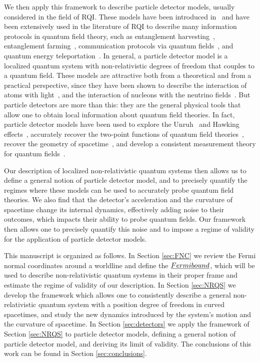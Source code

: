 \documentclass[prd,twocolumn,superscriptaddress,floatfix,amsmath,amssymb,amsfonts,longbibliography,nofootinbib]{revtex4-1}
\begin{document}
We then apply this framework to describe particle detector models, usually considered in the field of RQI. These models have been introduced in~\cite{Unruh1976,DeWitt} and have been extensively used in the literature of RQI to describe many information protocols in quantum field theory, such as entanglement harvesting~\cite{Valentini1991,Reznik1,vacuumEntanglement,vacuumBell,Petar,Pozas-Kerstjens:2015,Pozas2016,ericksonBH,ericksonNew,carol}, entanglement farming~\cite{Farming}, communication protocols via quantum fields~\cite{Benincasa_2014,Jonsson2,Jonsson3,Landulfo,martin-martinez2015,Jonsson4,Katja,Simidzija_2020}, and quantum energy teleportation~\cite{teleportation,nichoTeleport}. In general, a particle detector model is a localized quantum system with non-relativistic degrees of freedom that couples to a quantum field. These models are attractive both from a theoretical and from a practical perspective, since they have been shown to describe the interaction of atoms with light~\cite{Pozas2016,Nicho1,richard}, and the interaction of nucleons with the neutrino fields~\cite{neutrinos,antiparticles,carol}. But particle detectors are more than this: they are the general physical tools that allow one to obtain local information about quantum field theories. In fact, particle detector models have been used to explore the Unruh~\cite{Unruh1976,Takagi,matsasUnruh,waitUnruh,unruhEffectNoThermal,unruhSlow,garay,mine} and Hawking effects~\cite{Unruh1976,bhDetectors,bhDetectorsAdS,bhDetectorsBTZ}, accurately recover the two-point functions of quantum field theories~\cite{pipo,geometry}, recover the geometry of spacetime~\cite{geometry,ahmed}, and develop a consistent measurement theory for quantum fields~\cite{chicken}. 

Our description of localized non-relativistic quantum systems then allows us to define a general notion of particle detector model, and to precisely quantify the regimes where these models can be used to accurately probe quantum field theories. We also find that the detector's acceleration and the curvature of spacetime change its internal dynamics, effectively adding noise to their outcomes, which impacts their ability to probe quantum fields. Our framework then allows one to precisely quantify this noise and to impose a regime of validity for the application of particle detector models.

This manuscript is organized as follows. In Section \ref{sec:FNC} we review the Fermi normal coordinates around a worldline and define the $\emph{Fermi bound}$, which will be used to describe non-relativistic quantum systems in their proper frame and estimate the regime of validity of our description. In Section \ref{sec:NRQS} we develop the framework which allows one to consistently describe a general non-relativistic quantum system with a position degree of freedom in curved spacetimes, and study the new dynamics introduced by the system's motion and the curvature of spacetime. In Section \ref{sec:detectors} we apply the framework of Section \ref{sec:NRQS} to particle detector models, defining a general notion of particle detector model, and deriving its limit of validity. The conclusions of this work can be found in Section \ref{sec:conclusions}.
\end{document}

